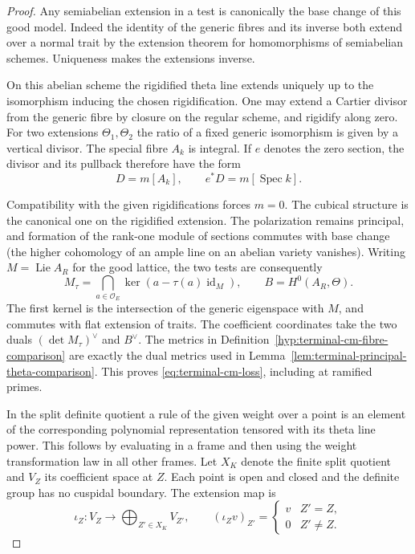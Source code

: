 \begin{proof}
Any semiabelian extension in a test is canonically the base change
of this good model. Indeed the identity of the generic fibres and its
inverse both extend over a normal trait by the extension theorem for
homomorphisms of semiabelian schemes. Uniqueness makes the extensions inverse.
\cite[Chapter~I, Proposition~2.7]{faltings-chai}

On this abelian scheme the rigidified theta line extends uniquely
up to the isomorphism inducing the chosen rigidification. One may
extend a Cartier divisor from the generic fibre by closure on the regular
scheme, and rigidify along zero. For two extensions \(\Theta_1,\Theta_2\) the ratio of a fixed
generic isomorphism is given by a vertical divisor. The special fibre
\(A_k\) is integral. If \(e\) denotes the zero section, the divisor and
its pullback therefore have the form
\[
      D=m[A_k],\qquad e^*D=m[\operatorname{Spec} k].
\]

Compatibility with the given rigidifications forces \(m=0\). The cubical structure is the canonical
one on the rigidified extension. The polarization remains principal,
and formation of the rank-one module of sections commutes with base
change (the higher cohomology of an ample line on an abelian variety
vanishes). Writing \(M=\operatorname{Lie} A_R\) for the good lattice,
the two tests are consequently
\[
    M_\tau=\bigcap_{a\in\mathcal O_E}\ker(a-\tau(a)\operatorname{id}_M),
       \qquad B=H^0(A_R,\Theta).
\]
The first kernel is the intersection of the generic eigenspace with
\(M\), and commutes with flat extension of traits. The coefficient
coordinates take the two duals \((\det M_\tau)^\vee\) and \(B^\vee\).
The metrics in Definition~\ref{hyp:terminal-cm-fibre-comparison} are exactly
the dual metrics used in Lemma~\ref{lem:terminal-principal-theta-comparison}.
This proves \eqref{eq:terminal-cm-loss}, including at ramified primes.

In the split definite quotient a rule of the given weight over a point
is an element of the corresponding polynomial representation tensored
with its theta line power. This follows by evaluating in a frame and
then using the weight transformation law in all other frames.
Let \(X_K\) denote the finite split quotient and \(V_Z\) its coefficient
space at \(Z\). Each point is open and closed and the definite group
has no cuspidal boundary. The extension map is
\[
 \iota_Z:V_Z\longrightarrow\bigoplus_{Z'\in X_K}V_{Z'},\qquad
    (\iota_Z v)_{Z'}=
       \begin{cases}v&Z'=Z,\\0&Z'\ne Z.\end{cases}
\]


\end{proof}
